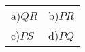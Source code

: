  \setlength{\tabcolsep}{80pt}
 \renewcommand{\arraystretch}{2}
 
  \begin{tabular}{l c}
	  a)$QR$ & b)$PR$ \\
	  c)$PS$ & d)$PQ$
  \end{tabular}
